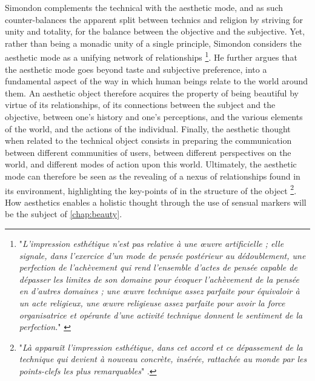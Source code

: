 Simondon complements the technical with the aesthetic mode, and as such counter-balances the apparent split between technics and religion by striving for unity and totality, for the balance between the objective and the subjective. Yet, rather than being a monadic unity of a single principle, Simondon considers the aesthetic mode as a unifying network of relationships \footnote{"\emph{L'impression esthétique n'est pas relative à une œuvre artificielle ; elle signale, dans l'exercice d'un mode de pensée postérieur au dédoublement, une perfection de l'achèvement qui rend l'ensemble d'actes de pensée capable de dépasser les limites de son domaine pour évoquer l'achèvement de la pensée en d'autres domaines ; une œuvre technique assez parfaite pour équivaloir à un acte religieux, une œuvre religieuse assez parfaite pour avoir la force organisatrice et opérante d'une activité technique donnent le sentiment de la perfection.}" \citep{simondon_mode_1958}}. He further argues that the aesthetic mode goes beyond taste and subjective preference, into a fundamental aspect of the way in which human beings relate to the world around them. An aesthetic object therefore acquires the property of being beautiful by virtue of its relationships, of its connections between the subject and the objective, between one's history and one's perceptions, and the various elements of the world, and the actions of the individual. Finally, the aesthetic thought when related to the technical object consists in preparing the communication between different communities of users, between different perspectives on the world, and different modes of action upon this world. Ultimately, the aesthetic mode can therefore be seen as the revealing of a nexus of relationships found in its environment, highlighting the key-points of in the structure of the object \footnote{"\emph{Là apparaît l'impression esthétique, dans cet accord et ce dépassement de la technique qui devient à nouveau concrète, insérée, rattachée au monde par les points-clefs les plus remarquables}" \citep{simondon_mode_1958}.}. How aesthetics enables a holistic thought through the use of sensual markers will be the subject of \ref{chap:beauty}.


